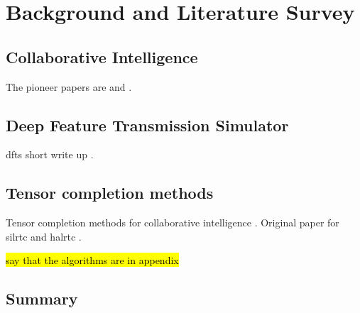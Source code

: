 \chapter{Background and Literature Survey} \label{chapter:background}

\section{Collaborative Intelligence} \label{sec:background:ci}


The pioneer papers are \cite{jointdnn} and \cite{neurosurgeon}.


\section{Deep Feature Transmission Simulator} \label{sec:background:dfts}

\gls{dfts} short write up \cite{unnibhavi2018dfts}.

\section{Tensor completion methods} \label{sec:background:tc}

Tensor completion methods for collaborative intelligence \cite{9017944}. Original paper for \gls{silrtc} and \gls{halrtc} \cite{liu2012tensor}.


\hl{say that the algorithms are in appendix}

\section{Summary} \label{sec:background:summary}